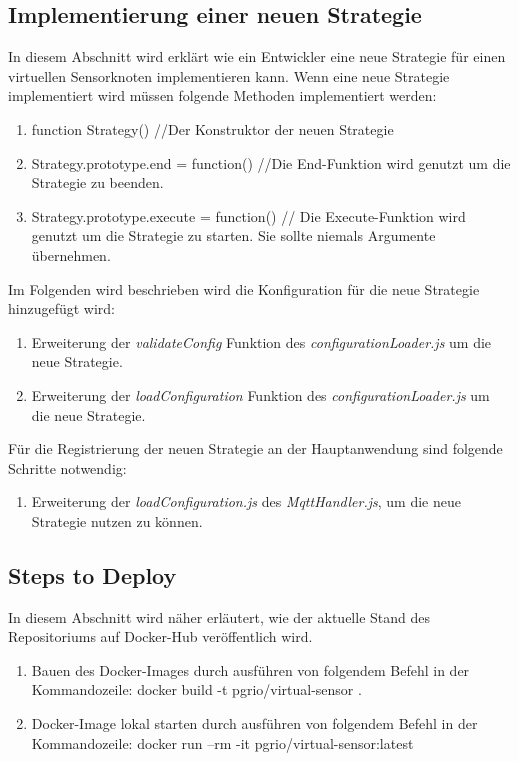 \subsection{Implementierung einer neuen Strategie}
In diesem Abschnitt wird erklärt wie ein Entwickler eine neue Strategie für einen virtuellen Sensorknoten implementieren kann.
 Wenn eine neue Strategie implementiert wird müssen folgende Methoden implementiert werden:
	\begin{enumerate}
		\item function Strategy() {} //Der Konstruktor der neuen Strategie
		\item Strategy.prototype.end = function() {} //Die End-Funktion wird genutzt um die Strategie zu beenden.
		\item Strategy.prototype.execute = function() {} // Die Execute-Funktion wird genutzt um die Strategie zu starten. Sie sollte niemals Argumente übernehmen.
	\end{enumerate}
Im Folgenden wird beschrieben wird die Konfiguration für die neue Strategie hinzugefügt wird:
	\begin{enumerate}
		\item Erweiterung der \textit{validateConfig} Funktion des \textit{configurationLoader.js} um die neue Strategie.
		\item Erweiterung der \textit{loadConfiguration} Funktion des \textit{configurationLoader.js} um die neue Strategie.
	\end{enumerate}
Für die Registrierung der neuen Strategie an der Hauptanwendung sind folgende Schritte notwendig:
	\begin{enumerate}
		\item Erweiterung der \textit{loadConfiguration.js} des \textit{MqttHandler.js}, um die neue Strategie nutzen zu können.
	\end{enumerate}


\subsection{Steps to Deploy}
In diesem Abschnitt wird näher erläutert, wie der aktuelle Stand des Repositoriums auf Docker-Hub veröffentlich wird.
\begin{enumerate}
	\item Bauen des Docker-Images durch ausführen von folgendem Befehl in der Kommandozeile: docker build -t pgrio/virtual-sensor .
	\item Docker-Image lokal starten durch ausführen von folgendem Befehl in der Kommandozeile: docker run --rm -it pgrio/virtual-sensor:latest
\end{enumerate}

